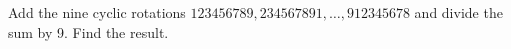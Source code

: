 Add the nine cyclic rotations $ 123456789,234567891,\ldots,912345678 $ and divide the sum by 9. Find the result.
